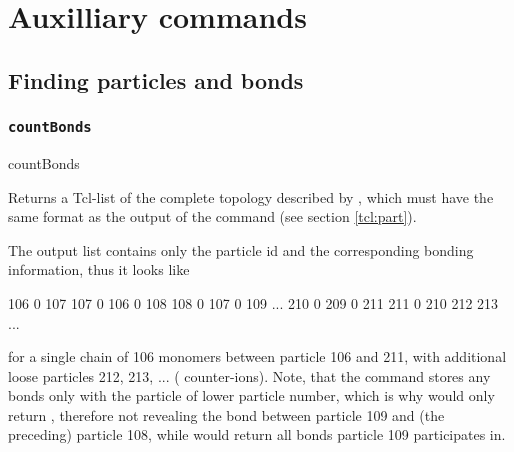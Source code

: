 %  
%   
%  
%  
%
\chapter{Auxilliary commands}
\label{chap:aux}


\section{Finding particles and bonds}


\subsection{\texttt{countBonds}}
\begin{essyntax}
  countBonds 
\end{essyntax}
Returns a Tcl-list of the complete topology described by
, which must have the same format as the output of
the command  (see section \vref{tcl:part}).

The output list contains only the particle id and the corresponding
bonding information, thus it looks like \eg{}
\begin{tclcode}
{106 {0 107}} {107 {0 106} {0 108}} {108 {0 107} {0 109}} ...
{210 {0 209} {0 211}} {211 {0 210}} 212 213 ... 
\end{tclcode}
for a single chain of 106 monomers between particle 106 and 211, with
additional loose particles 212, 213, ... (\eg{} counter-ions).  Note,
that the  command stores any bonds only with the particle of
lower particle number, which is why \codebox{[part 109]} would only
return , therefore not revealing the
bond between particle 109 and (the preceding) particle 108, while
 would return all bonds particle 109 participates in.


